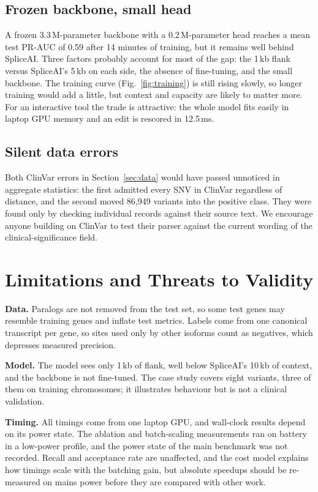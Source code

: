 \documentclass[conference]{IEEEtran}
\begin{document}
\subsection{Frozen backbone, small head}
A frozen 3.3\,M-parameter backbone with a 0.2\,M-parameter head reaches a mean test PR-AUC of 0.59 after 14 minutes of training, but it remains well behind SpliceAI. Three factors probably account for most of the gap: the 1\,kb flank versus SpliceAI's 5\,kb on each side, the absence of fine-tuning, and the small backbone. The training curve (Fig.~\ref{fig:training}) is still rising slowly, so longer training would add a little, but context and capacity are likely to matter more. For an interactive tool the trade is attractive: the whole model fits easily in laptop GPU memory and an edit is rescored in 12.5\,ms.

\subsection{Silent data errors}
Both ClinVar errors in Section~\ref{sec:data} would have passed unnoticed in aggregate statistics: the first admitted every SNV in ClinVar regardless of distance, and the second moved 86{,}949 variants into the positive class. They were found only by checking individual records against their source text. We encourage anyone building on ClinVar to test their parser against the current wording of the clinical-significance field.

\section{Limitations and Threats to Validity}\label{sec:limits}
\textbf{Data.} Paralogs are not removed from the test set, so some test genes may resemble training genes and inflate test metrics. Labels come from one canonical transcript per gene, so sites used only by other isoforms count as negatives, which depresses measured precision.

\textbf{Model.} The model sees only 1\,kb of flank, well below SpliceAI's 10\,kb of context, and the backbone is not fine-tuned. The case study covers eight variants, three of them on training chromosomes; it illustrates behaviour but is not a clinical validation.

\textbf{Timing.} All timings come from one laptop GPU, and wall-clock results depend on its power state. The ablation and batch-scaling measurements ran on battery in a low-power profile, and the power state of the main benchmark was not recorded. Recall and acceptance rate are unaffected, and the cost model explains how timings scale with the batching gain, but absolute speedups should be re-measured on mains power before they are compared with other work.
\end{document}
